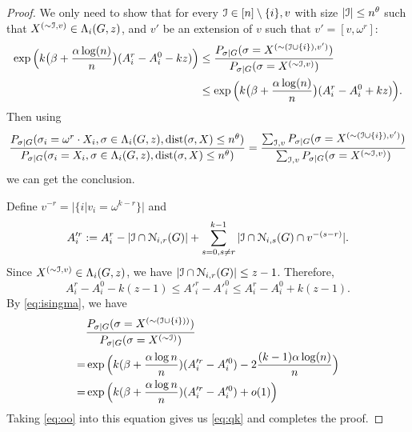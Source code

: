 \documentclass{article}
\begin{document}
\begin{proof}
We only need to show that for every $\mathcal{I}\in [n]\setminus\{i\},v$ with size $|\mathcal{I}|\le n^\theta$ such that $X^{(\sim\mathcal{I},v)}\in \Lambda_i(G,z)$,
and $v'$ be an extension of $v$ such that $v'=[v, \omega^r]$:
\begin{equation} \label{eq:qk}
\begin{aligned}
\exp\Big(k\big(\beta+\frac{\alpha\log(n)}{n} \big) (A^r_i-A^0_i - kz) \Big) & \le 
\frac{P_{\sigma|G}(\sigma= X^{(\sim(\mathcal{I}\cup\{i\}), v')} ) } { P_{\sigma|G}(\sigma= X^{(\sim\mathcal{I},v)} ) } \\
& \le \exp\Big(k\big(\beta+\frac{\alpha\log(n)}{n} \big) (A^r_i-A^0_i + kz) \Big) .
\end{aligned}
\end{equation}
Then using 
$$
\frac{P_{\sigma|G}(\sigma_i= \omega^r \cdot X_i, \sigma\in \Lambda_i(G,z) ,\operatorname{dist}(\sigma, X) \le n^{\theta} ) } 
{ P_{\sigma|G}(\sigma_i=X_i, \sigma\in \Lambda_i(G,z) ,\operatorname{dist}(\sigma, X) \le n^{\theta} ) } 
= \frac{\sum_{\mathcal{I}, v} P_{\sigma|G}(\sigma= X^{(\sim(\mathcal{I}\cup\{i\}), v')} ) } {\sum_{\mathcal{I}, v} P_{\sigma|G}(\sigma= X^{(\sim\mathcal{I},v)} ) } 
$$
we can get the conclusion.

Define $v^{-r} = |\{i | v_i = \omega^{k-r}\}|$ and
$$
A'^r_i :=A^r_i-|\mathcal{I}\cap \mathcal{N}_{i,r}(G)| + \sum_{s=0, s\neq r}^{k-1}|\mathcal{I}\cap \mathcal{N}_{i,s}(G) \cap v^{-(s-r)}| .
$$
Since $X^{(\sim\mathcal{I}, v)}\in \Lambda_i(G,z)$, we have $|\mathcal{I}\cap \mathcal{N}_{i,r}(G)| \le z-1$. Therefore,
\begin{equation} \label{eq:oo}
A^r_i-A^0_i-k(z-1) \le A'^r_i-A'^0_i\le A^r_i-A^0_i+k(z-1) .
\end{equation}
By \eqref{eq:isingma}, we have
\begin{align*}
& \frac{P_{\sigma|G}(\sigma= X^{(\sim(\mathcal{I}\cup\{i\}))} ) } { P_{\sigma|G}(\sigma= X^{(\sim\mathcal{I})} ) } \\
= & \exp\Big(k(\beta+\frac{\alpha\log n }{n})(A'^r_i-A'^0_i)
-2\frac{(k-1)\alpha\log(n)}{n}
\Big)
 \\
= & \exp\Big(k(\beta+\frac{\alpha\log n }{n})(A'^r_i-A'^0_i)+o(1) \Big)
\end{align*}
Taking \eqref{eq:oo} into this equation gives us \eqref{eq:qk} and completes the proof.
\end{proof}
\end{document}
